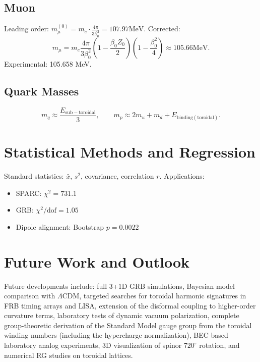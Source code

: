 \documentclass[11pt,a4paper]{article}
\begin{document}
\subsection{Muon}
Leading order: \(m_{\mu}^{(0)} = m_{e}\cdot \frac{4\pi}{3\beta_{0}^{2}} = 107.97\mathrm{MeV}\). Corrected:
\begin{equation}
m_{\mu} = m_{e}\frac{4\pi}{3\beta_{0}^{2}}\left(1 - \frac{\beta_{0}Z_{0}}{2}\right)\left(1 - \frac{\beta_{0}^{2}}{4}\right)\approx 105.66\mathrm{MeV}. \tag{70}
\end{equation}
Experimental: 105.658 MeV.

\subsection{Quark Masses}
\begin{equation}
m_{q}\approx \frac{E_{\mathrm{sub - toroidal}}}{3},\qquad m_{p}\approx 2m_{u} + m_{d} + E_{\mathrm{binding(toroidal)}}. \tag{71}
\end{equation}

\section{Statistical Methods and Regression}
Standard statistics: \(\bar{x}\), \(s^2\), covariance, correlation \(r\). Applications:
\begin{itemize}
\item SPARC: \(\chi^2 = 731.1\)
\item GRB: \(\chi^2 /\mathrm{dof} = 1.05\)
\item Dipole alignment: Bootstrap \(p = 0.0022\)
\end{itemize}

\section{Future Work and Outlook}
Future developments include: full 3+1D GRB simulations, Bayesian model comparison with \(\Lambda\)CDM, targeted searches for toroidal harmonic signatures in FRB timing arrays and LISA, extension of the disformal coupling to higher-order curvature terms, laboratory tests of dynamic vacuum polarization, complete group-theoretic derivation of the Standard Model gauge group from the toroidal winding numbers (including the hypercharge normalization), BEC-based laboratory analog experiments, 3D visualization of spinor \(720^{\circ}\) rotation, and numerical RG studies on toroidal lattices.
\end{document}
